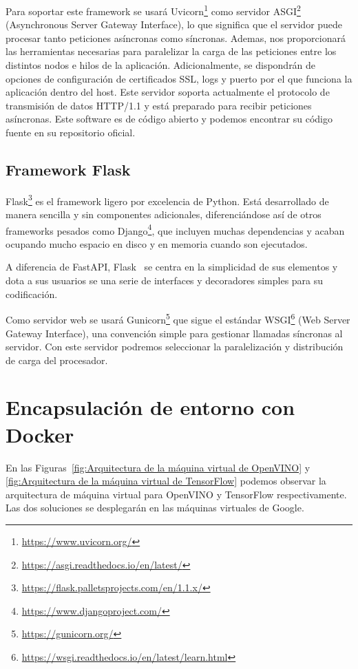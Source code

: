 Para soportar este framework se usará Uvicorn\footnote{\url{https://www.uvicorn.org/}} como servidor ASGI\footnote{\url{https://asgi.readthedocs.io/en/latest/}} (Asynchronous Server Gateway Interface), lo que significa que el servidor puede procesar tanto peticiones asíncronas como síncronas.
Ademas, nos proporcionará las herramientas necesarias para paralelizar la carga de las peticiones entre los distintos nodos e hilos de la aplicación.
Adicionalmente, se dispondrán de opciones de configuración de certificados SSL, logs y puerto por el que funciona la aplicación dentro del host.
Este servidor soporta actualmente el protocolo de transmisión de datos HTTP/1.1 y está preparado para recibir peticiones asíncronas.
Este software es de código abierto y podemos encontrar su código fuente en su repositorio oficial.


\subsection{Framework Flask}\label{subsec:framework-flask}
Flask\footnote{\url{https://flask.palletsprojects.com/en/1.1.x/}} es el framework ligero por excelencia de Python. Está desarrollado de manera sencilla y sin componentes adicionales, diferenciándose así de otros frameworks pesados como Django\footnote{\url{https://www.djangoproject.com/}}, que incluyen
muchas dependencias y acaban ocupando mucho espacio en disco y en memoria cuando son ejecutados.

A diferencia de FastAPI, Flask~\cite{python_flask} se centra en la simplicidad de sus elementos y dota a sus usuarios se una serie de interfaces y decoradores simples para su codificación.

Como servidor web se usará Gunicorn\footnote{\url{https://gunicorn.org/}} que sigue el estándar WSGI\footnote{\url{https://wsgi.readthedocs.io/en/latest/learn.html}} (Web Server Gateway Interface), una convención simple para gestionar llamadas síncronas al servidor.
Con este servidor podremos seleccionar la paralelización y distribución de carga del procesador.

\section{Encapsulación de entorno con Docker}\label{sec:encapsulación-de-entorno-con-docker}
En las Figuras~\ref{fig:Arquitectura de la máquina virtual de OpenVINO} y \ref{fig:Arquitectura de la máquina virtual de TensorFlow} podemos observar la arquitectura de máquina virtual para OpenVINO y TensorFlow respectivamente. Las dos soluciones se desplegarán en las máquinas virtuales de Google.

